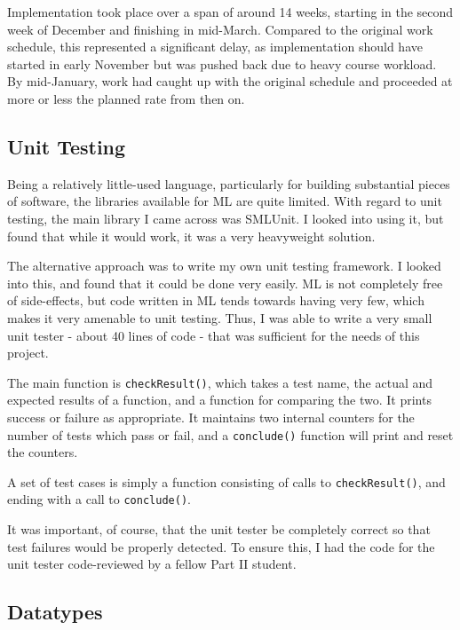 \documentclass[12pt]{article}
\begin{document}


Implementation took place over a span of around 14 weeks, starting in the second week of December and finishing in mid-March. 
Compared to the original work schedule, this represented a significant delay, as implementation should have started in early November but was pushed back due to heavy course workload. 
By mid-January, work had caught up with the original schedule and proceeded at more or less the planned rate from then on.

\subsection{Unit Testing}

Being a relatively little-used language, particularly for building substantial pieces of software, the libraries available for ML are quite limited. 
With regard to unit testing, the main library I came across was SMLUnit. 
I looked into using it, but found that while it would work, it was a very heavyweight solution.

The alternative approach was to write my own unit testing framework. 
I looked into this, and found that it could be done very easily. 
ML is not completely free of side-effects, but code written in ML tends towards having very few, which makes it very amenable to unit testing. 
Thus, I was able to write a very small unit tester - about 40 lines of code - that was sufficient for the needs of this project.

The main function is \verb|checkResult()|, which takes a test name, the actual and expected results of a function, and a function for comparing the two. 
It prints success or failure as appropriate. 
It maintains two internal counters for the number of tests which pass or fail, and a \verb|conclude()| function will print and reset the counters.

A set of test cases is simply a function consisting of calls to \verb|checkResult()|, and ending with a call to \verb|conclude()|.

It was important, of course, that the unit tester be completely correct so that test failures would be properly detected. 
To ensure this, I had the code for the unit tester code-reviewed by a fellow Part II student.

\subsection{Datatypes}
\end{document}
